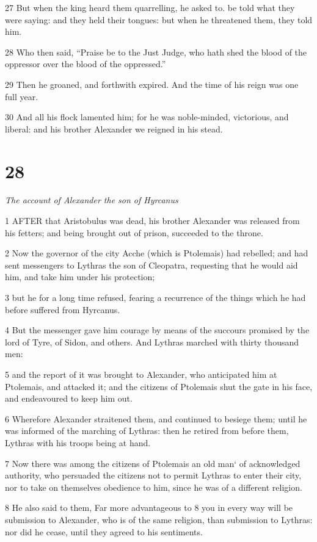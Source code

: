 27 But when the king heard them quarrelling, he asked to. be told what they were saying: and they held their tongues: but when he threatened them, they told him. 

28 Who then said, “Praise be to the Just Judge, who hath shed the blood of the oppressor over the blood of the oppressed.” 

29 Then he groaned, and forthwith expired. And the time of his reign was one full year. 

30 And all his flock lamented him; for he was noble-minded, victorious, and liberal: and his brother Alexander we reigned in his stead. 

\chapter{28}

\par \textit{The account of Alexander the son of Hyrcanus}

1 AFTER that Aristobulus was dead, his brother Alexander was released from his fetters; and being brought out of prison, succeeded to the throne. 

2 Now the governor of the city Acche (which is Ptolemais) had rebelled; and had sent messengers to Lythras the son of Cleopatra, requesting that he would aid him, and take him under his protection; 

3 but he for a long time refused, fearing a recurrence of the things which he had before suffered from Hyrcanus. 

4 But the messenger gave him courage by means of the succours promised by the lord of Tyre, of Sidon, and others. And Lythras marched with thirty thousand men: 

5 and the report of it was brought to Alexander, who anticipated him at Ptolemais, and attacked it; and the citizens of Ptolemais shut the gate in his face, and endeavoured to keep him out. 

6 Wherefore Alexander straitened them, and continued to besiege them; until he was informed of the marching of Lythras: then he retired from before them, Lythras with his troops being at hand. 

7 Now there was among the citizens of Ptolemais an old man‘ of acknowledged authority, who persuaded the citizens not to permit Lythras to enter their city, nor to take on themselves obedience to him, since he was of a different religion. 

8 He also said to them, Far more advantageous to 8 you in every way will be submission to Alexander, who is of the same religion, than submission to Lythras: nor did he cease, until they agreed to his sentiments. 

